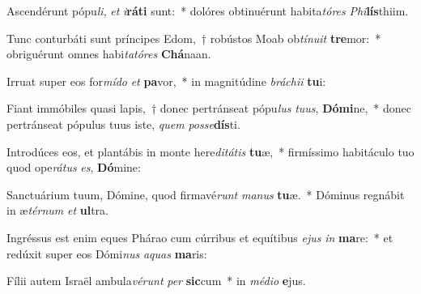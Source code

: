 \item Ascendérunt pópu\textit{li}, \textit{et} \textit{i}\textbf{rá}\textbf{ti} sunt:~* dolóres obtinuérunt habita\textit{tó}\textit{res} \textit{Phi}\textbf{lís}thiim.
\item Tunc conturbáti sunt príncipes Edom,~† robústos Moab ob\textit{tí}\textit{nu}\textit{it} \textbf{tre}mor:~* obriguérunt omnes habi\textit{ta}\textit{tó}\textit{res} \textbf{Chá}naan.
\item Irruat super eos for\textit{mí}\textit{do} \textit{et} \textbf{pa}vor,~* in magnitúdine \textit{brá}\textit{chi}\textit{i} \textbf{tu}i:
\item Fiant immóbiles quasi lapis,~† donec pertránseat pópu\textit{lus} \textit{tu}\textit{us}, \textbf{Dó}\textbf{mi}ne,~* donec pertránseat pópulus tuus iste, \textit{quem} \textit{pos}\textit{se}\textbf{dís}ti.
\item Introdúces eos, et plantábis in monte here\textit{di}\textit{tá}\textit{tis} \textbf{tu}æ,~* firmíssimo habitáculo tuo quod ope\textit{rá}\textit{tus} \textit{es}, \textbf{Dó}mine:
\item Sanctuárium tuum, Dómine, quod firmavé\textit{runt} \textit{ma}\textit{nus} \textbf{tu}æ.~* Dóminus regnábit in æ\textit{tér}\textit{num} \textit{et} \textbf{ul}tra.
\item Ingréssus est enim eques Phárao cum cúrribus et equítibus \textit{e}\textit{jus} \textit{in} \textbf{ma}re:~* et redúxit super eos Dómi\textit{nus} \textit{a}\textit{quas} \textbf{ma}ris:
\item Fílii autem Israël ambula\textit{vé}\textit{runt} \textit{per} \textbf{sic}cum~* in \textit{mé}\textit{di}\textit{o} \textbf{e}jus.
